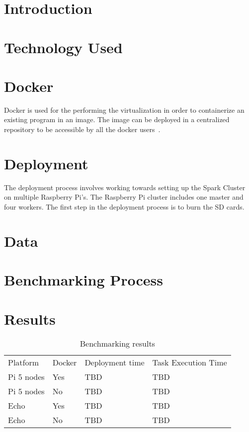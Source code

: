 \section{Introduction}

\section{Technology Used}

\section{Docker}
Docker is used for the performing the virtualization in order to 
containerize an existing program in an image.
The image can be deployed in a centralized repository to be accessible 
by all the docker users~\cite{hid-sp18-412-wikepedia}.

\section{Deployment}
The deployment process involves working towards setting up the 
Spark Cluster on multiple Raspberry Pi's. The Raspberry Pi cluster
includes one master and four workers. The first step in the 
deployment process is to burn the SD cards.

\section{Data}


\section{Benchmarking Process}

\section{Results}


\begin{table}[hbt]
\caption{Benchmarking results}\label{t:results-table}
\begin{center}
\begin{tabular}{llll}
Platform    & Docker & Deployment time & Task Execution Time \\
Pi 5 nodes  & Yes    & TBD             & TBD            \\
Pi 5 nodes  & No     & TBD             & TBD            \\
Echo        & Yes    & TBD             & TBD            \\
Echo        & No     & TBD             & TBD            \\
\end{tabular}
\end{center}
\end{table}


